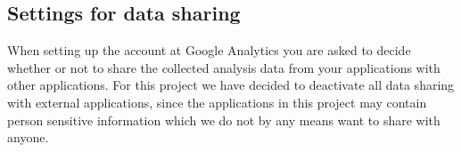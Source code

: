 \subsection{Settings for data sharing}
When setting up the account at Google Analytics you are asked to decide whether or not to share the collected analysis data from your applications with other applications.
For this project we have decided to deactivate all data sharing with external applications, since the applications in this project may contain person sensitive information which we do not by any means want to share with anyone.

%
